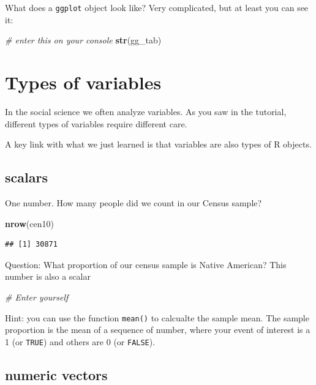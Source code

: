 \documentclass[]{book}
\newenvironment{Shaded}{\begin{snugshade}}{\end{snugshade}}
\newcommand{\KeywordTok}[1]{\textcolor[rgb]{0.13,0.29,0.53}{\textbf{#1}}}
\newcommand{\CommentTok}[1]{\textcolor[rgb]{0.56,0.35,0.01}{\textit{#1}}}
\newcommand{\NormalTok}[1]{#1}
\theoremstyle{definition}
\theoremstyle{definition}
\theoremstyle{definition}
\theoremstyle{remark}
\begin{document}
What does a \texttt{ggplot} object look like? Very complicated, but at
least you can see it:

\begin{Shaded}
\begin{Highlighting}[]
\CommentTok{# enter this on your console}
\KeywordTok{str}\NormalTok{(gg_tab)}
\end{Highlighting}
\end{Shaded}

\section{Types of variables}\label{types-of-variables}

In the social science we often analyze variables. As you saw in the
tutorial, different types of variables require different care.

A key link with what we just learned is that variables are also types of
R objects.

\subsection{scalars}\label{scalars}

One number. How many people did we count in our Census sample?

\begin{Shaded}
\begin{Highlighting}[]
\KeywordTok{nrow}\NormalTok{(cen10)}
\end{Highlighting}
\end{Shaded}

\begin{verbatim}
## [1] 30871
\end{verbatim}

Question: What proportion of our census sample is Native American? This
number is also a scalar

\begin{Shaded}
\begin{Highlighting}[]
\CommentTok{# Enter yourself}
\end{Highlighting}
\end{Shaded}

Hint: you can use the function \texttt{mean()} to calcualte the sample
mean. The sample proportion is the mean of a sequence of number, where
your event of interest is a 1 (or \texttt{TRUE}) and others are 0 (or
\texttt{FALSE}).

\subsection{numeric vectors}\label{numeric-vectors}
\end{document}
